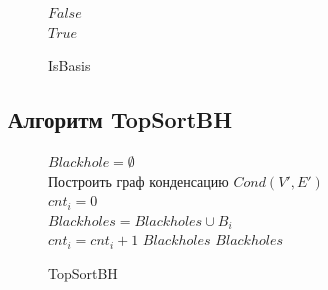 \documentclass[12pt,a4paper,oneside,openany]{article}
\theoremstyle{definition}
\theoremstyle{lemma}
\theoremstyle{remark}
\begin{document}
\begin{figure}[H]
\begin{center}
\begin{algorithm}[H]
{{{{                                    }
                                }
                            }
			}
                         {
                             {
                                \Return $False$ \\
                            }
                        }
                        \Return $True$
			\label{alg:isbasis}
			\caption{IsBasis}
		\end{algorithm}
	\end{center}
\end{figure}
\linespread{1.5}


\subsection{Алгоритм TopSortBH}\label{subsec:topsortbh}

\linespread{1.0}
\begin{figure}[H]
	\begin{center}
		\begin{algorithm}[H]
			\SetAlgoLined

                        $Blackhole = \emptyset$\\
                        Построить граф конденсацию $Cond(V',E')$ \\
                         {
                            $cnt_i = 0$ \\
                             {
                                 {
                                     {
                                        $Blackholes = Blackholes \cup B_i$ \\
                                        $cnt_i = cnt_i + 1$
                                    }
                                }
                            }
                             {
                                \Return $Blackholes$
                            }
                        }
                        \Return $Blackholes$
			\label{alg:topsort}
			\caption{TopSortBH}
		\end{algorithm}
	\end{center}
\end{figure}
\linespread{1.5}
\end{document}
